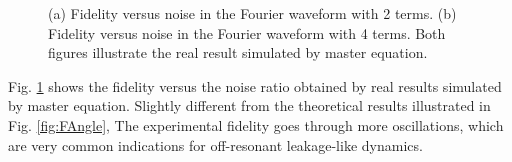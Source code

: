 \documentclass[conference, 9pt]{IEEEtran}
\begin{document}
\begin{figure}
    \centering
    \caption{(a) Fidelity versus noise in the Fourier waveform with 2 terms. (b) Fidelity versus noise in the Fourier waveform with 4 terms. Both figures illustrate the real result simulated by master equation.}
    \label{fig:Ffid}
\end{figure}
Fig. \ref{fig:Ffid} shows the fidelity versus the noise ratio obtained by real results simulated by master equation. Slightly different from the theoretical results illustrated in Fig. \ref{fig:FAngle}, The experimental fidelity goes through more oscillations, which are very common indications for off-resonant leakage-like dynamics. 
\iffalse
\end{document}
